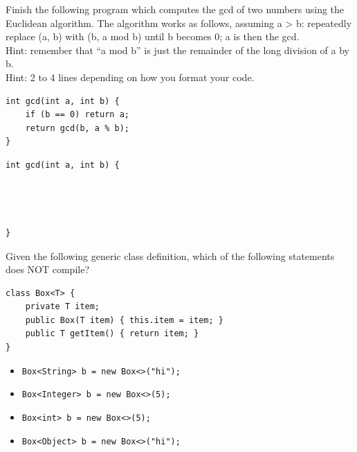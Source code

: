 \begin{question}
Finish the following program which computes the gcd of two numbers using the Euclidean algorithm.
The algorithm works as follows, assuming a > b: repeatedly replace (a, b) with (b, a mod b) until b becomes 0; a is then the gcd.\\
Hint: remember that ``a mod b'' is just the remainder of the long division of a by b.\\
Hint: 2 to 4 lines depending on how you format your code.

\ifanswers
\begin{lstlisting}
int gcd(int a, int b) {
    if (b == 0) return a;
    return gcd(b, a % b);
}
\end{lstlisting}
\else
\begin{lstlisting}
int gcd(int a, int b) {




}
\end{lstlisting}
\fi
\end{question}

\begin{question}
Given the following generic class definition, which of the following statements does NOT compile?

\begin{lstlisting}
class Box<T> {
    private T item;
    public Box(T item) { this.item = item; }
    public T getItem() { return item; }
}
\end{lstlisting}

\begin{itemize}[leftmargin=2em,itemsep=1pt,topsep=2pt]
\item[\cb{0}] \lstinline|Box<String> b = new Box<>("hi");|
\item[\cb{0}] \lstinline|Box<Integer> b = new Box<>(5);|
\item[\cb{1}] \lstinline|Box<int> b = new Box<>(5);|
\item[\cb{0}] \lstinline|Box<Object> b = new Box<>("hi");|
\end{itemize}
\end{question}
